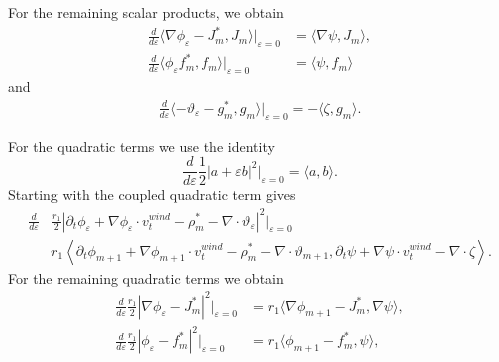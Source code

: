 For the remaining scalar products, we obtain
\begin{align*}
	\frac{d}{d\varepsilon}\langle\nabla\phi_\varepsilon - J_m^*,J_m\rangle\Big\lvert_{\varepsilon=0} &= \langle\nabla\psi,J_m\rangle,\\
		\frac{d}{d\varepsilon}\langle\phi_\varepsilon f_m^*,f_m\rangle\Big\lvert_{\varepsilon = 0} &=\langle\psi,f_m\rangle
\end{align*}
and
\begin{align*}
	\frac{d}{d\varepsilon}\langle-\vartheta_\varepsilon-g_m^*,g_m\rangle\Big\lvert_{\varepsilon=0} = -\langle\zeta,g_m\rangle.
\end{align*}


For the quadratic terms we use the identity
$$
\frac{d}{d\varepsilon}\frac{1}{2} \lvert a+\varepsilon b\rvert^2\Big\lvert_{\varepsilon = 0} = \langle a,b\rangle.
$$
Starting with the coupled quadratic term gives
\begin{align*}
	\frac{d}{d\varepsilon}&\frac{r_1}{2} |\partial_t\phi_\varepsilon + \nabla\phi_\varepsilon \cdot v_t^{wind} - \rho_m^* - \nabla \cdot \vartheta_\varepsilon|^2\Big\lvert_{\varepsilon = 0}\\
						  &r_1\left\langle\partial_t\phi_{m+1} + \nabla\phi_{m+1}\cdot v_t^{wind}-\rho_m^* - \nabla \cdot \vartheta_{m+1},\partial_t\psi + \nabla\psi \cdot v_t^{wind} - \nabla \cdot\zeta\right\rangle.
\end{align*}
For the remaining quadratic terms we obtain
\begin{align*}
	\frac{d}{d\varepsilon}\frac{r_1}{2}|\nabla\phi_\varepsilon - J_m^*|^2\Big\lvert_{\varepsilon = 0} &=r_1\langle\nabla\phi_{m+1}-J_m^*,\nabla\psi\rangle,\\
		\frac{d}{d\varepsilon}\frac{r_1}{2}|\phi_\varepsilon - f_m^*|^2\Big\lvert_{\varepsilon=0} &=r_1\langle\phi_{m+1}-f_m^*,\psi\rangle,
\end{align*}
